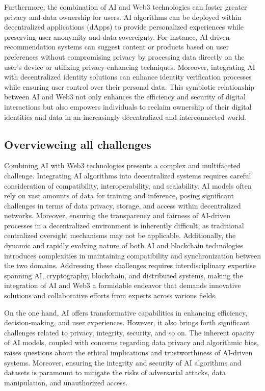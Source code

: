 \documentclass[conference]{IEEEtran}
\begin{document}
Furthermore, the combination of AI and Web3 technologies can foster greater privacy and data ownership for users. AI algorithms can be deployed within decentralized applications (dApps) to provide personalized experiences while preserving user anonymity and data sovereignty. For instance, AI-driven recommendation systems can suggest content or products based on user preferences without compromising privacy by processing data directly on the user's device or utilizing privacy-enhancing techniques. Moreover, integrating AI with decentralized identity solutions can enhance identity verification processes while ensuring user control over their personal data. This symbiotic relationship between AI and Web3 not only enhances the efficiency and security of digital interactions but also empowers individuals to reclaim ownership of their digital identities and data in an increasingly decentralized and interconnected world.

\subsection{Overvieweing all challenges}

Combining AI with Web3 technologies presents a complex and multifaceted challenge. Integrating AI algorithms into decentralized systems requires careful consideration of compatibility, interoperability, and scalability. AI models often rely on vast amounts of data for training and inference, posing significant challenges in terms of data privacy, storage, and access within decentralized networks. Moreover, ensuring the transparency and fairness of AI-driven processes in a decentralized environment is inherently difficult, as traditional centralized oversight mechanisms may not be applicable. Additionally, the dynamic and rapidly evolving nature of both AI and blockchain technologies introduces complexities in maintaining compatibility and synchronization between the two domains. Addressing these challenges requires interdisciplinary expertise spanning AI, cryptography, blockchain, and distributed systems, making the integration of AI and Web3 a formidable endeavor that demands innovative solutions and collaborative efforts from experts across various fields.

On the one hand, AI offers transformative capabilities in enhancing efficiency, decision-making, and user experiences. However, it also brings forth significant challenges related to privacy, integrity, security, and so on. The inherent opacity of AI models, coupled with concerns regarding data privacy and algorithmic bias, raises questions about the ethical implications and trustworthiness of AI-driven systems. Moreover, ensuring the integrity and security of AI algorithms and datasets is paramount to mitigate the risks of adversarial attacks, data manipulation, and unauthorized access.
\end{document}
